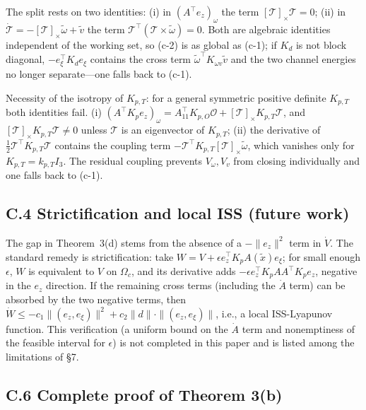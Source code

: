 The split rests on two identities: (i) in $(A^\top e_z)_\omega$ the term $[\mathcal T]_\times\mathcal T=0$; (ii) in $\dot{\mathcal T}=-[\mathcal T]_\times\tilde\omega+\tilde v$ the term $\mathcal T^\top(\mathcal T\times\tilde\omega)=0$. Both are algebraic identities independent of the working set, so (c-2) is as global as (c-1); if $K_d$ is not block diagonal, $-e_\xi^\top K_de_\xi$ contains the cross term $\tilde\omega^\top K_{\omega v}\tilde v$ and the two channel energies no longer separate---one falls back to (c-1).

Necessity of the isotropy of $K_{p,T}$: for a general symmetric positive definite $K_{p,T}$ both identities fail. (i) $(A^\top K_pe_z)_\omega=A_{11}^\top K_{p,O}\mathcal O+[\mathcal T]_\times K_{p,T}\mathcal T$, and $[\mathcal T]_\times K_{p,T}\mathcal T\ne0$ unless $\mathcal T$ is an eigenvector of $K_{p,T}$; (ii) the derivative of $\tfrac12\mathcal T^\top K_{p,T}\mathcal T$ contains the coupling term $-\mathcal T^\top K_{p,T}[\mathcal T]_\times\tilde\omega$, which vanishes only for $K_{p,T}=k_{p,T}I_3$. The residual coupling prevents $V_\omega,V_v$ from closing individually and one falls back to (c-1).

\subsection*{C.4 Strictification and local ISS (future work)}

The gap in Theorem~3(d) stems from the absence of a $-\|e_z\|^2$ term in $\dot V$. The standard remedy is strictification: take $W=V+\epsilon e_z^\top K_pA(\tilde x)e_\xi$; for small enough $\epsilon$, $W$ is equivalent to $V$ on $\Omega_c$, and its derivative adds $-\epsilon e_z^\top K_pAA^\top K_pe_z$, negative in the $e_z$ direction. If the remaining cross terms (including the $\dot A$ term) can be absorbed by the two negative terms, then $\dot W\le-c_1\|(e_z,e_\xi)\|^2+c_2\|d\|\cdot\|(e_z,e_\xi)\|$, i.e., a local ISS-Lyapunov function. This verification (a uniform bound on the $\dot A$ term and nonemptiness of the feasible interval for $\epsilon$) is not completed in this paper and is listed among the limitations of \S7.

\subsection*{C.6 Complete proof of Theorem 3(b)}

